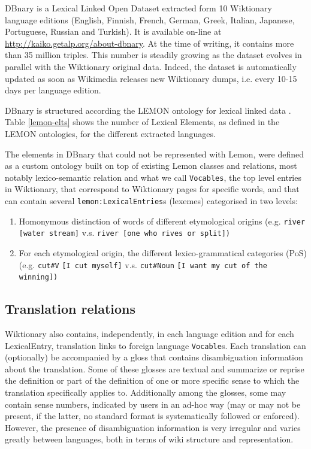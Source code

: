 \documentclass[10pt, a4paper]{article}
\begin{document}
DBnary is a Lexical Linked Open Dataset extracted form 10 Wiktionary language editions (English, Finnish, French, German, Greek, Italian, Japanese, Portuguese, Russian and Turkish). It is available on-line at \url{http://kaiko.getalp.org/about-dbnary}. At the time of writing, it contains more than 35 million triples. This number is steadily growing as the dataset evolves in parallel with the Wiktionary original data. Indeed, the dataset is automatically updated as soon as Wikimedia releases new Wiktionary dumps, i.e. every 10-15 days per language edition. 

DBnary is structured according the LEMON ontology for lexical linked data \cite{DBLP:conf/esws/McCraeSC11}. Table \ref{lemon-elts} shows the number of Lexical Elements, as defined in the LEMON ontologies, for the different extracted languages. 

The elements in DBnary that could not be represented with Lemon, were defined as a custom ontology built on top of existing Lemon classes and relations, most notably lexico-semantic relation and what we call \verb|Vocables|, the top level entries in Wiktionary, that correspond to Wiktionary pages for specific words, and that can contain several \verb|lemon:LexicalEntries|s (lexemes) categorised in two levels:
\begin{enumerate}
	\item Homonymous distinction of words of different etymological origins (e.g. \verb|river [water stream]| v.s. \verb|river [one who rives or split])|
	\item For each etymological origin, the different lexico-grammatical categories (PoS) (e.g. \verb|cut#V| \verb|[I cut myself]| v.s. \verb|cut#Noun| \verb|[I want my cut of the winning])|
\end{enumerate}

\subsection{Translation relations}
Wiktionary also contains, independently, in each language edition and for each LexicalEntry, translation links to foreign language \verb|Vocable|s. Each translation can (optionally) be accompanied by a gloss that contains disambiguation information about the translation. Some of these glosses are textual and summarize or reprise the definition or part of the definition of one or more specific sense to which the translation specifically applies to. Additionally among the glosses, some may contain sense numbers, indicated by users in an ad-hoc way (may or may not be present, if the latter, no standard format is systematically followed or enforced). However, the presence of disambiguation information is very irregular and varies greatly between languages, both in terms of wiki structure and representation.
\end{document}
